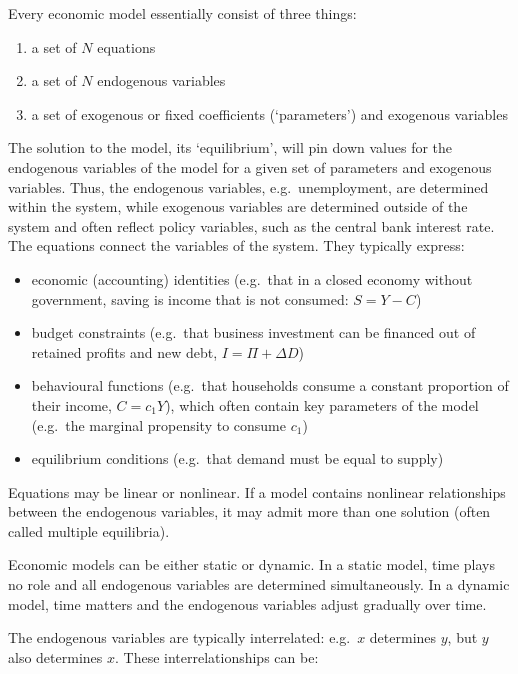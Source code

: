 \documentclass[
  letterpaper,
  DIV=11,
  numbers=noendperiod]{scrreprt}
\begin{document}
Every economic model essentially consist of three things:

\begin{enumerate}
\def\labelenumi{\arabic{enumi}.}
\item
  a set of \(N\) equations
\item
  a set of \(N\) endogenous variables
\item
  a set of exogenous or fixed coefficients (`parameters') and exogenous
  variables
\end{enumerate}

The solution to the model, its `equilibrium', will pin down values for
the endogenous variables of the model for a given set of parameters and
exogenous variables. Thus, the endogenous variables, e.g.~unemployment,
are determined within the system, while exogenous variables are
determined outside of the system and often reflect policy variables,
such as the central bank interest rate. The equations connect the
variables of the system. They typically express:

\begin{itemize}
\item
  economic (accounting) identities (e.g.~that in a closed economy
  without government, saving is income that is not consumed: \(S=Y-C\))
\item
  budget constraints (e.g.~that business investment can be financed out
  of retained profits and new debt, \(I=\Pi+\Delta D\))
\item
  behavioural functions (e.g.~that households consume a constant
  proportion of their income, \(C=c_1Y\)), which often contain key
  parameters of the model (e.g.~the marginal propensity to consume
  \(c_1\))
\item
  equilibrium conditions (e.g.~that demand must be equal to supply)
\end{itemize}

Equations may be linear or nonlinear. If a model contains nonlinear
relationships between the endogenous variables, it may admit more than
one solution (often called multiple equilibria).

Economic models can be either static or dynamic. In a static model, time
plays no role and all endogenous variables are determined
simultaneously. In a dynamic model, time matters and the endogenous
variables adjust gradually over time.

The endogenous variables are typically interrelated: e.g.~\(x\)
determines \(y\), but \(y\) also determines \(x\). These
interrelationships can be:
\end{document}
